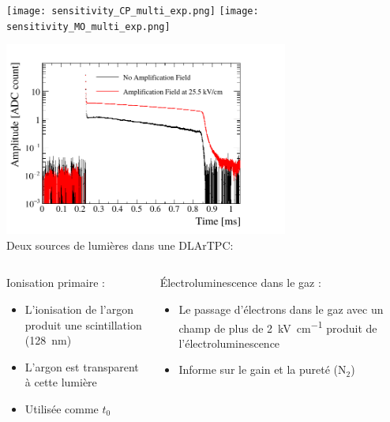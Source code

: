     {
        \begin{specialframe}
            \flushleft\hspace{-2cm}\texttt{[image: sensitivity\_CP\_multi\_exp.png]}
            \texttt{[image: sensitivity\_MO\_multi\_exp.png]}
        \end{specialframe}
    }
    {
        \begin{specialframe}
            \begin{scriptsize}
                \centering \includegraphics[width=0.7\textwidth]{./pictures/scintillation.pdf}\\\vfill
                \centering Deux sources de lumières dans une DLArTPC:
                \begin{columns}
                    \begin{column}{0.5\textwidth}
                        Ionisation primaire :
                        \begin{itemize}
                            \item L'ionisation de l'argon produit une scintillation (\SI{128}{\nano\meter})
                            \item L'argon est transparent à cette lumière
                            \item Utilisée comme $t_0$
                        \end{itemize}
                    \end{column}
                    \begin{column}{0.5\textwidth}
                        Électroluminescence dans le gaz :
                        \begin{itemize}
                            \item Le passage d'électrons dans le gaz avec un champ de plus de \SI{2}{\kilo\volt\per\centi\meter} produit de l'électroluminescence
                            \item Informe sur le gain et la pureté (N$_2$)
                        \end{itemize}
                    \end{column}
                \end{columns}
            \end{scriptsize}
        \end{specialframe}
    }
    

